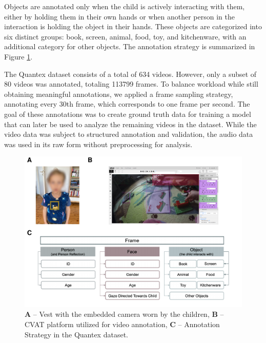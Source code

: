 \documentclass[
  man,floatsintext]{apa6}
\begin{document}
Objects are annotated only when the child is actively interacting with them, either by holding them in their own hands or when another person in the interaction is holding the object in their hands. These objects are categorized into six distinct groups: book, screen, animal, food, toy, and kitchenware, with an additional category for other objects. The annotation strategy is summarized in Figure \ref{fig:camera-cvat-activity-classes}.

The Quantex dataset consists of a total of 634 videos. However, only a subset of 80 videos was annotated, totaling 113799 frames. To balance workload while still obtaining meaningful annotations, we applied a frame sampling strategy, annotating every 30th frame, which corresponds to one frame per second. The goal of these annotations was to create ground truth data for training a model that can later be used to analyze the remaining videos in the dataset. While the video data was subject to structured annotation and validation, the audio data was used in its raw form without preprocessing for analysis.

\begin{figure}

{\centering \includegraphics{Quantex_interaction_paper_files/figure-latex/camera-cvat-activity-classes-1} 

}

\caption{\textbf{A} – Vest with the embedded camera worn by the children, \textbf{B} – CVAT platform utilized for video annotation, \textbf{C} – Annotation Strategy in the Quantex dataset.}\label{fig:camera-cvat-activity-classes}
\end{figure}
\end{document}
